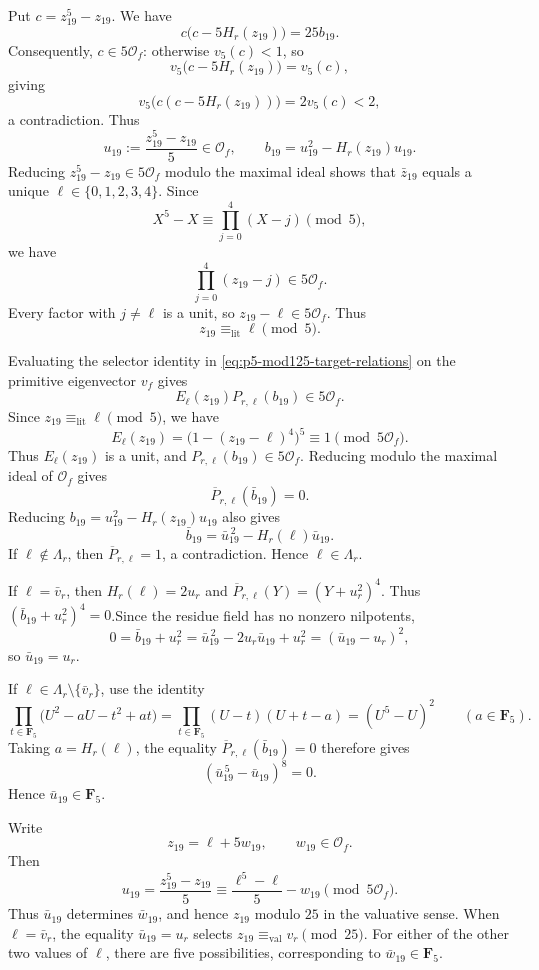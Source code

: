 \documentclass[11pt]{article}
\theoremstyle{plain}
\theoremstyle{definition}
\theoremstyle{remark}
\numberwithin{equation}{section}
\begin{document}
Put \(c=z_{19}^5-z_{19}\). We have  \[ c\bigl(c-5H_r(z_{19})\bigr)=25b_{19}. \] Consequently, \(c\in5\mathcal O_f\): otherwise \(v_5(c)<1\), so \[ v_5\bigl(c-5H_r(z_{19})\bigr)=v_5(c), \] giving \[ v_5\bigl(c(c-5H_r(z_{19}))\bigr)=2v_5(c)<2, \] a contradiction. Thus \[ u_{19}:=\frac{z_{19}^5-z_{19}}5\in\mathcal O_f, \qquad b_{19}=u_{19}^2-H_r(z_{19})u_{19}. \] Reducing \(z_{19}^5-z_{19}\in5\mathcal O_f\) modulo the
maximal ideal shows that \(\bar z_{19}\) equals a unique \(\ell\in\{0,1,2,3,4\}\). Since \[ X^5-X\equiv\prod_{j=0}^4(X-j)\pmod5, \] we have \[ \prod_{j=0}^4(z_{19}-j)\in5\mathcal O_f. \] Every factor with \(j\ne\ell\) is a unit, so \(z_{19}-\ell\in5\mathcal O_f\). Thus \[ z_{19}\equiv_{\mathrm{lit}}\ell\pmod5. \]

Evaluating the selector identity in \eqref{eq:p5-mod125-target-relations} on the primitive eigenvector \(v_f\) gives \[ E_\ell(z_{19})P_{r,\ell}(b_{19})\in5\mathcal O_f. \] Since \(z_{19}\equiv_{\mathrm{lit}}\ell\pmod5\), we have \[ E_\ell(z_{19}) =\bigl(1-(z_{19}-\ell)^4\bigr)^5 \equiv1\pmod{5\mathcal O_f}. \] Thus \(E_\ell(z_{19})\) is a unit, and \(P_{r,\ell}(b_{19})\in5\mathcal O_f\). Reducing modulo the maximal ideal of \(\mathcal O_f\) gives \[ \overline P_{r,\ell}(\bar b_{19})=0. \] Reducing \(b_{19}=u_{19}^2-H_r(z_{19})u_{19}\) also gives \[ \bar b_{19} =\bar u_{19}^{\,2}-H_r(\ell)\bar u_{19}. \] If \(\ell\notin\Lambda_r\), then \(\overline P_{r,\ell}=1\), a contradiction. Hence \(\ell\in\Lambda_r\). 

If \(\ell=\bar v_r\), then \(H_r(\ell)=2u_r\) and \(\overline P_{r,\ell}(Y)=(Y+u_r^2)^4\). Thus \((\bar b_{19}+u_r^2)^4=0\).Since the residue field has no nonzero nilpotents,  \[ 0=\bar b_{19}+u_r^2 =\bar u_{19}^{\,2}-2u_r\bar u_{19}+u_r^2 =(\bar u_{19}-u_r)^2, \] so \(\bar u_{19}=u_r\).

If \(\ell\in\Lambda_r\setminus\{\bar v_r\}\), use the identity \[ \prod_{t\in\mathbf F_5} \bigl(U^2-aU-t^2+at\bigr) = \prod_{t\in\mathbf F_5}(U-t)(U+t-a) =(U^5-U)^2 \qquad(a\in\mathbf F_5). \] Taking \(a=H_r(\ell)\), the equality \(\overline P_{r,\ell}(\bar b_{19})=0\) therefore gives \[ (\bar u_{19}^{\,5}-\bar u_{19})^8=0. \] Hence \(\bar u_{19}\in\mathbf F_5\).


Write \[ z_{19}=\ell+5w_{19}, \qquad w_{19}\in\mathcal O_f. \] Then \[ u_{19} =\frac{z_{19}^5-z_{19}}5 \equiv\frac{\ell^5-\ell}{5}-w_{19} \pmod{5\mathcal O_f}. \] Thus \(\bar u_{19}\) determines \(\bar w_{19}\), and hence \(z_{19}\) modulo \(25\) in the valuative sense. When \(\ell=\bar v_r\), the equality \(\bar u_{19}=u_r\) selects \(z_{19}\equiv_{\mathrm{val}}v_r\pmod{25}\). For either of the other two values of \(\ell\), there are five possibilities, corresponding to \(\bar w_{19}\in\mathbf F_5\).
\end{document}
